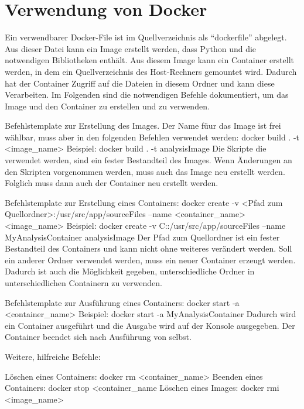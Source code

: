 \section{Verwendung von Docker}
\label{docker:examples}

Ein verwendbarer Docker-File ist im Quellverzeichnis als \enquote{dockerfile} abgelegt.
Aus dieser Datei kann ein Image erstellt werden, dass Python und die notwendigen Bibliotheken enthält.
Aus diesem Image kann ein Container erstellt werden, in dem ein Quellverzeichnis des Host-Rechners gemountet wird.
Dadurch hat der Container Zugriff auf die Dateien in diesem Ordner und kann diese Verarbeiten.
Im Folgenden sind die notwendigen Befehle dokumentiert, um das Image und den Container zu erstellen und zu verwenden.
{}{}
	
\begin{DockerCommands}
Befehlstemplate zur Erstellung des Images. Der Name füur das Image ist frei wählbar, muss aber in den folgenden Befehlen verwendet werden:
	docker build . -t <image_name>
Beispiel:
		docker build . -t analysisImage
Die Skripte die verwendet werden, sind ein fester Bestandteil des Images. Wenn Änderungen an den Skripten vorgenommen werden, muss auch das Image neu erstellt werden.
Folglich muss dann auch der Container neu erstellt werden.
		
Befehlstemplate zur Erstellung eines Containers:
	docker create  -v <Pfad zum Quellordner>:/usr/src/app/sourceFiles  --name <container_name>  <image_name>
Beispiel:	
	docker create  -v C:\Temp\sourcefiles:/usr/src/app/sourceFiles  --name MyAnalysisContainer  analysisImage
Der Pfad zum Quellordner ist ein fester Bestandteil des Containers und kann nicht ohne weiteres verändert werden.
Soll ein anderer Ordner verwendet werden, muss ein neuer Container erzeugt werden. Dadurch ist auch die Möglichkeit gegeben, unterschiedliche Ordner in unterschiedlichen Containern zu verwenden.

Befehlstemplate zur Ausführung eines Containers:
	docker start -a <container_name>
Beispiel:
	docker start -a MyAnalysisContainer
Dadurch wird ein Container ausgeführt und die Ausgabe wird auf der Konsole ausgegeben. Der Container beendet sich nach Ausführung von selbst.

Weitere, hilfreiche Befehle:

Löschen eines Containers:
	docker rm <container_name>
Beenden eines Containers:
	docker stop <container_name
Löschen eines Images:
	docker rmi <image_name>
\end{DockerCommands}